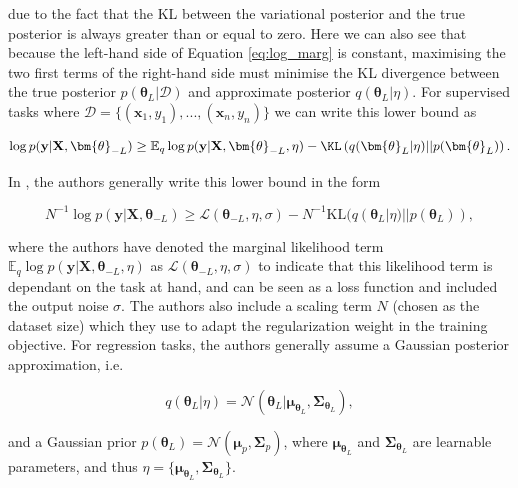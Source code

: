 \noindent due to the fact that the KL between the variational posterior and the true posterior is always greater than or equal to zero. Here we can also see that because the left-hand side of Equation \ref{eq:log_marg} is constant, maximising the two first terms of the right-hand side must minimise the KL divergence between the true posterior $p(\bm{\theta}_L|\mathcal{D})$ and approximate posterior $q(\bm{\theta}_L|\eta)$. For supervised tasks where $\mathcal{D}=\{(\mathbf{x}_1,y_1),...,(\mathbf{x}_n,y_n)\}$ we can write this lower bound as

\begin{align}
    \log p(\mathbf{y}|\mathbf{X}, \bm{\theta}_{-L})\geq \mathbb{E}_q\log p(\mathbf{y}|\mathbf{X}, \bm{\theta}_{-L}, \eta)-\KL\left(q(\bm{\theta}_L|\eta)||p(\bm{\theta}_L)\right).
\end{align}

\noindent In \cite{2024_VBLL}, the authors generally write this lower bound in the form

\begin{equation}
    N^{-1} \log p(\mathbf{y}|\mathbf{X}, \bm{\theta}_{-L}) \geq \mathcal{L}(\bm{\theta}_{-L}, \eta, \sigma) - N^{-1} \text{KL}(q(\bm{\theta}_L|\eta)||p(\bm{\theta}_L)),
    \label{eq:marg_lowerbound_vbll}
\end{equation}

\noindent where the authors have denoted the marginal likelihood term $\mathbb{E}_q\log p(\mathbf{y}|\mathbf{X}, \bm{\theta}_{-L}, \eta)$ as $\mathcal{L}(\bm{\theta}_{-L}, \eta, \sigma)$ to indicate that this likelihood term is dependant on the task at hand, and can be seen as a loss function and included the output noise $\sigma$. The authors also include a scaling term $N$ (chosen as the dataset size) which they use to adapt the regularization weight in the training objective. For regression tasks, the authors generally assume a Gaussian posterior approximation, i.e.

\begin{equation}
    q(\bm{\theta}_L|\eta) = \mathcal{N}(\bm{\theta}_L|\bm\mu_{\bm{\theta}_L}, \bm\Sigma_{\bm{\theta}_L}),
\end{equation}

\noindent and a Gaussian prior $p(\bm{\theta}_L)=\mathcal{N}(\bm\mu_p, \bm\Sigma_p)$, where $\bm\mu_{\bm{\theta}_L}$ and $\bm\Sigma_{\bm{\theta}_L}$ are learnable parameters, and thus $\eta = \{\bm\mu_{\bm{\theta}_L}, \bm\Sigma_{\bm{\theta}_L}\}$. \\

